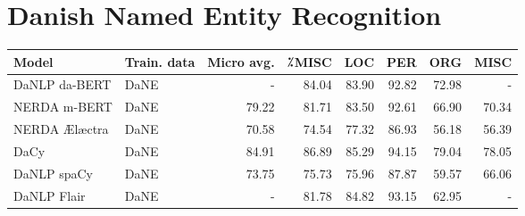 \documentclass[main.tex]{subfiles}
\begin{document}
\section{Danish Named Entity Recognition}%
\label{sec:Danish Named Entity Recognition}
\begin{table}                                                                                                                                                                                                                           
        \begin{center}                                                                                                                                                                                                                  
                \begin{tabular}{l l r r r r r r}                                                                                                                                                                                        
                        Model & Train. data & Micro avg. & ⁒MISC & LOC & PER & ORG & MISC \\                                                                                                                                          
                        \hline                                                                                                                                                                                                          
                        DaNLP da-BERT & DaNE & - & 84.04 & 83.90 & 92.82 & 72.98 & - \\                                                                                                                                                 
                        NERDA m-BERT & DaNE & 79.22 & 81.71 & 83.50 & 92.61 & 66.90 & 70.34 \\                                                                                                                                          
                        NERDA Ælæctra & DaNE & 70.58 & 74.54 & 77.32 & 86.93 & 56.18 & 56.39 \\                     
                        DaCy & DaNE & 84.91 & 86.89 & 85.29 & 94.15 & 79.04 & 78.05 \\                              
                        DaNLP spaCy & DaNE & 73.75 & 75.73 & 75.96 & 87.87 & 59.57 & 66.06 \\                       
                        DaNLP Flair & DaNE & - & 81.78 & 84.82 & 93.15 & 62.95 & - \\                               

\end{tabular}
\end{center}
\end{table}
\end{document}
